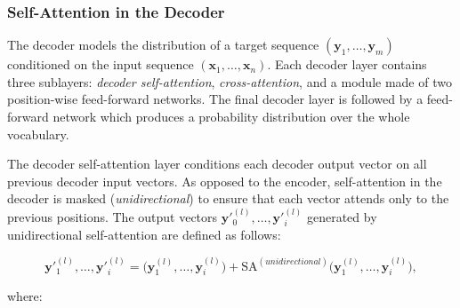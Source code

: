 \subsubsection{Self-Attention in the Decoder} 

The decoder models the distribution of a target sequence $(\bm{y}_1, \ldots, \bm{y}_m)$ conditioned on the input sequence $(\bm{x}_1, \ldots, \bm{x}_n)$. Each decoder layer contains three sublayers: \textit{decoder self-attention}, \textit{cross-attention}, and a module made of two position-wise feed-forward networks. The final decoder layer is followed by a feed-forward network which produces a probability distribution over the whole vocabulary. 

The decoder self-attention layer conditions each decoder output vector on all previous decoder input vectors. As opposed to the encoder, self-attention in the decoder is masked (\textit{unidirectional}) to ensure that each vector attends only to the previous positions. The output vectors $\bm{y}'^{(l)}_0, \ldots, \bm{y}'^{(l)}_i$ generated by unidirectional self-attention are defined as follows:



\begin{equation}
        \bm{y}'^{(l)}_1, \ldots, \bm{y}'^{(l)}_{i} = \bigl(\bm{y}^{(l)}_1, \ldots, \bm{y}^{(l)}_{i}\bigr) + \textrm{SA}^{(unidirectional)}\bigl(\bm{y}^{(l)}_1, \ldots, \bm{y}^{(l)}_{i}\bigr), 
\end{equation}

\noindent where:

